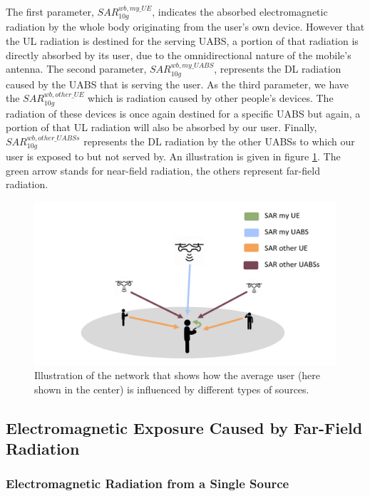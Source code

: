 \documentclass[twocolumn]{phdsymp} %
\begin{document}
The first parameter, $SAR^{wb,my\_UE}_{10g}$, indicates the absorbed electromagnetic radiation by the whole body originating from the user's own device. However that the 
\gls{UL} radiation is destined for the serving \gls{UABS}, a portion of that radiation is directly absorbed by its user, due to the omnidirectional nature of the mobile's antenna.
The second parameter, $SAR^{wb,my\_UABS}_{10g}$, represents the \gls{DL} radiation caused by the \gls{UABS} that is serving the user.
As the third parameter, we have the $SAR^{wb,other\_UE}_{10g}$ which is radiation caused by other people's devices. The radiation of these devices is once again 
destined for a specific \gls{UABS} but again, a portion of that \gls{UL} radiation will also be absorbed by our user.
Finally, $SAR^{wb,other\_UABSs}_{10g}$ represents the \gls{DL} radiation by the other \gls{UABS}s to which our user is exposed to but not served by.
An illustration is given in figure \ref{fig:networkIllustration}.
The green arrow stands for near-field radiation, the others represent far-field radiation.

\begin{figure}[h!]
\centering
  \includegraphics[width=\linewidth]{networkIllustrationSARSources.png}
  \caption{Illustration of the network that shows how the average user (here shown in the center) is influenced by different types of sources. }
  \label{fig:networkIllustration}
\end{figure}

\subsection{Electromagnetic Exposure Caused by Far-Field Radiation} %
\label{sub:Calculatingdownlinkexposure}

\subsubsection{Electromagnetic Radiation from a Single Source}
\label{sec:calculatingexposure}
\end{document}

